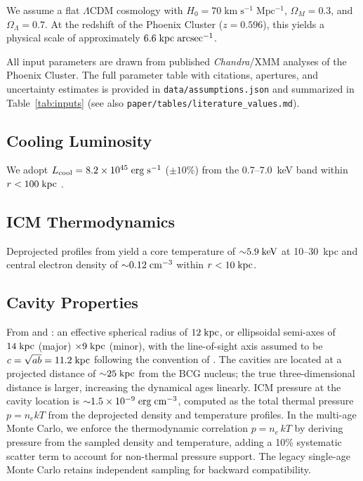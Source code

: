 \documentclass[twocolumn]{aastex63}
\newcommand{\codeloc}[1]{\texttt{#1}}
\newcommand{\Lcool}{L_{\rm cool}}
\newcommand{\keV}{\rm keV}
\newcommand{\erg}{\rm erg}
\newcommand{\kpc}{\rm kpc}
\newcommand{\s}{\rm s}
\newcommand{\cm}{\rm cm}
\begin{document}
We assume a flat $\Lambda$CDM cosmology with $H_0 = 70\;\mathrm{km\;s^{-1}\;Mpc^{-1}}$,
$\Omega_M = 0.3$, and $\Omega_\Lambda = 0.7$. At the redshift of the Phoenix
Cluster ($z = 0.596$), this yields a physical scale of approximately
$6.6\;\kpc\;\mathrm{arcsec}^{-1}$.

All input parameters are drawn from published \textit{Chandra}/XMM analyses of
the Phoenix Cluster. The full parameter table with citations, apertures, and
uncertainty estimates is provided in \codeloc{data/assumptions.json} and
summarized in Table~\ref{tab:inputs} (see also
\codeloc{paper/tables/literature\_values.md}).

\subsection{Cooling Luminosity}

We adopt $\Lcool = 8.2 \times 10^{45}\;\erg\;\s^{-1}$ ($\pm 10\%$) from the
0.7--7.0~keV band within $r < 100\;\kpc$ \citep{McDonald2012, McDonald2019}.

\subsection{ICM Thermodynamics}

Deprojected profiles from \citet{McDonald2019} yield a core temperature of
${\sim}5.9\;\keV$ at 10--30~kpc and central electron density of
${\sim}0.12\;\cm^{-3}$ within $r < 10\;\kpc$.

\subsection{Cavity Properties}

From \citet{McDonald2015} and \citet{Hlavacek-Larrondo2015}: an effective
spherical radius of $12\;\kpc$, or ellipsoidal semi-axes of $14\;\kpc$ (major)
$\times 9\;\kpc$ (minor), with the line-of-sight axis assumed to be
$c = \sqrt{ab} = 11.2\;\kpc$ following the convention of \citet{Birzan2004}.
The cavities are located at a projected distance of ${\sim}25\;\kpc$ from the
BCG nucleus; the true three-dimensional distance is larger, increasing the
dynamical ages linearly. ICM pressure at the cavity location is
${\sim}1.5 \times 10^{-9}\;\erg\;\cm^{-3}$, computed as the total thermal
pressure $p = n_e k T$ from the deprojected density and temperature profiles.
In the multi-age Monte Carlo, we enforce the thermodynamic correlation
$p = n_e\,kT$ by deriving pressure from the sampled density and temperature,
adding a 10\% systematic scatter term to account for non-thermal pressure
support. The legacy single-age Monte Carlo retains independent sampling
for backward compatibility.
\end{document}
